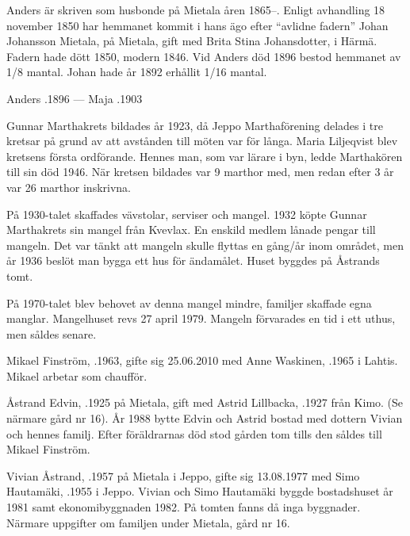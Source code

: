 Anders är skriven som husbonde på Mietala åren 1865--. Enligt avhandling 18 november 1850 har hemmanet kommit i hans ägo efter	``avlidne fadern'' Johan Johansson Mietala,  på Mietala, gift med Brita Stina Johansdotter,  i Härmä. Fadern hade dött 1850, modern 1846.	Vid Anders död 1896 bestod hemmanet av 1/8 mantal. Johan hade år 1892 erhållit 1/16 mantal.

Anders .1896  ---  Maja .1903




Gunnar Marthakrets bildades år 1923, då Jeppo Marthaförening delades i tre kretsar på grund av att avstånden till möten var för långa. Maria Liljeqvist blev kretsens första ordförande. Hennes man, som var lärare i byn, ledde Marthakören till sin död 1946. När kretsen bildades var 9 marthor med, men redan efter 3 år var 26 marthor inskrivna.

På 1930-talet skaffades vävstolar, serviser och mangel. 1932 köpte Gunnar Marthakrets sin mangel från Kvevlax. En enskild medlem lånade pengar till mangeln. Det var tänkt att mangeln skulle flyttas en gång/år inom området, men år 1936 beslöt man bygga ett hus för ändamålet. Huset byggdes på Åstrands tomt.

På 1970-talet blev behovet av denna mangel mindre, familjer skaffade egna manglar. Mangelhuset revs 27 april 1979. Mangeln förvarades en tid i ett uthus, men såldes senare.






Mikael Finström, .1963, gifte sig 25.06.2010 med Anne Waskinen, .1965 i Lahtis. Mikael arbetar som chaufför.\jhvspace{}


Åstrand Edvin, .1925 på Mietala, gift med Astrid Lillbacka, .1927 från Kimo. (Se närmare gård nr 16). År 1988 bytte Edvin och Astrid bostad med dottern Vivian och hennes familj. Efter föräldrarnas död stod gården tom tills den såldes till Mikael Finström.


Vivian Åstrand, .1957  på Mietala i Jeppo, gifte sig 13.08.1977 med Simo Hautamäki, .1955 i Jeppo. Vivian och Simo Hautamäki byggde bostadshuset år 1981 samt ekonomibyggnaden 1982. På tomten fanns då inga byggnader. Närmare uppgifter om familjen under Mietala, gård nr 16.



